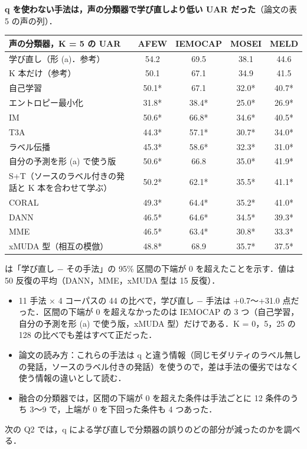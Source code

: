 \documentclass[a4paper,10pt]{ltjsarticle}
\begin{document}
\medskip
\noindent\textbf{q を使わない手法は，声の分類器で学び直しより低い UAR だった}（論文の表 5 の声の列）．
\begin{center}
\small
\begin{tabular}{lcccc}
\toprule
声の分類器，K = 5 の UAR & AFEW & IEMOCAP & MOSEI & MELD \\
\midrule
\rowcolor{cQ1!8} 学び直し（形 (a)．参考） & 54.2 & 69.5 & 38.1 & 44.6 \\
K 本だけ（参考） & 50.1 & 67.1 & 34.9 & 41.5 \\
\midrule
自己学習 & 50.1* & 67.1 & 32.0* & 40.7* \\
エントロピー最小化 & 31.8* & 38.4* & 25.0* & 26.9* \\
IM & 50.6* & 66.8* & 34.6* & 40.5* \\
T3A & 44.3* & 57.1* & 30.7* & 34.0* \\
ラベル伝播 & 45.3* & 58.6* & 32.3* & 31.0* \\
自分の予測を形 (a) で使う版 & 50.6* & 66.8 & 35.0* & 41.9* \\
S+T（ソースのラベル付きの発話と K 本を合わせて学ぶ） & 50.2* & 62.1* & 35.5* & 41.1* \\
CORAL & 49.3* & 64.4* & 35.2* & 41.0* \\
DANN & 46.5* & 64.6* & 34.5* & 39.3* \\
MME & 46.5* & 63.4* & 30.8* & 33.3* \\
xMUDA 型（相互の模倣） & 48.8* & 68.9 & 35.7* & 37.5* \\
\bottomrule
\end{tabular}

\smallskip
{\footnotesize * は「学び直し − その手法」の 95\% 区間の下端が 0 を超えたことを示す．値は 50 反復の平均（DANN，MME，xMUDA 型は 15 反復）．}
\end{center}
\begin{itemize}
  \item 11 手法 × 4 コーパスの 44 の比べで，学び直し − 手法は +0.7〜+31.0 点だった．区間の下端が 0 を超えなかったのは IEMOCAP の 3 つ（自己学習，自分の予測を形 (a) で使う版，xMUDA 型）だけである．K = 0，5，25 の 128 の比べでも差はすべて正だった．
  \item 論文の読み方：これらの手法は q と違う情報（同じモダリティのラベル無しの発話，ソースのラベル付きの発話）を使うので，差は手法の優劣ではなく使う情報の違いとして読む．
  \item 融合の分類器では，区間の下端が 0 を超えた条件は手法ごとに 12 条件のうち 3〜9 で，上端が 0 を下回った条件も 4 つあった．
\end{itemize}
\noindent 次の Q2 では，q による学び直しで分類器の誤りのどの部分が減ったのかを調べる．
\end{document}
